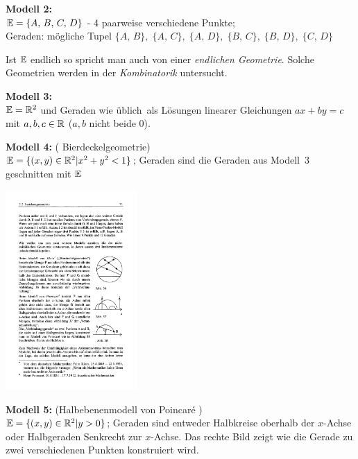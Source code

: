 {\bf Modell 2:}\\
$\mathbb E=\{A,\,B,\,C,\,D\}$ - 4 paarweise verschiedene Punkte;\\
Geraden: mögliche Tupel $\{A,\,B\},\;\{A,\,C\},\;\{A,\,D\},\;\{B,\,C\},\;\{B,\,D\},\;\{C,\,D\}$

Ist $\mathbb E$ endlich so spricht man auch von einer {\em endlichen Geometrie}.
Solche Geometrien werden in der {\em Kombinatorik} untersucht.


{\bf Modell 3:}\\$\mathbb E=\mathbb R^2$ und Geraden \glqq wie üblich\grqq\ als
Lösungen linearer Gleichungen $a x + b y = c$ mit $a,b,c\in \mathbb R$ ($a,b$
nicht beide $0$).

{\bf Modell 4:} ( \glqq Bierdeckelgeometrie\grqq )\\ %
$\mathbb E=\{ (x,y)\in\mathbb R^2 | x^2+y^2<1 \}$;
Geraden sind die Geraden aus Modell~3 geschnitten mit $\mathbb E$



\centerline{\includegraphics[width=5cm]{BILDER/BildBierdeckelgeometrie.pdf}}


\bigskip


{\bf Modell 5:} (\glqq Halbebenenmodell von Poincar\'e \grqq )\\
$\mathbb E=\{ (x,y)\in\mathbb R^2 | y>0 \}$;
Geraden sind entweder Halbkreise oberhalb der $x$-Achse
oder Halbgeraden Senkrecht zur $x$-Achse. Das rechte Bild zeigt wie 
die Gerade zu zwei verschiedenen Punkten konstruiert wird. 


